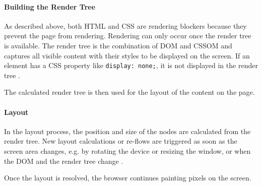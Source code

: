 

\paragraph{Building the Render Tree} %

As described above, both HTML and CSS are rendering blockers because they prevent the page from rendering.
Rendering can only occur once the render tree is available.
The render tree is the combination of DOM and CSSOM and captures all visible content with their styles to be displayed on the screen.
If an element has a CSS property like \verb|display: none;|, it is not displayed in the render tree \cite{2019GrigorikRenderTree}.

The calculated render tree is then used for the layout of the content on the page.





\paragraph{Layout} %

In the layout process, the position and size of the nodes are calculated from the render tree.
New layout calculations or re-flows are triggered as soon as the screen area changes, e.g. by rotating the device or resizing the window, or when the DOM and the render tree change \cite{2021MDNHowBrowsersWork}.

Once the layout is resolved, the browser continues painting pixels on the screen.







